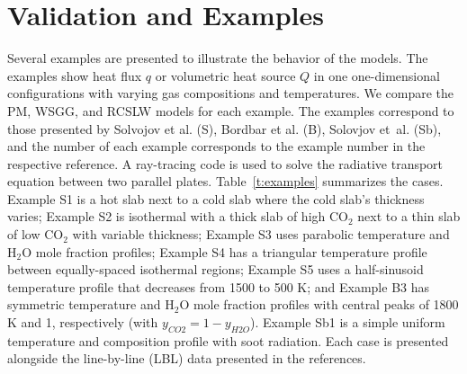 \documentclass[preprint,12pt]{elsarticle}
\begin{document}

\section{Validation and Examples} \label{s:Examples}

Several examples are presented to illustrate the behavior of the models. The examples show heat flux $q$ or volumetric heat source $Q$ in one one-dimensional configurations with varying gas compositions and temperatures. We compare the PM, WSGG, and RCSLW models for each example. The examples correspond to those presented by Solvojov et al. \cite{Solovjov_2017} (S), Bordbar et al. \cite{Bordbar_2020} (B), Solovjov et~al. \cite{Solovjov_2001} (Sb), and the number of each example corresponds to the example number in the respective reference. A ray-tracing code is used to solve the radiative transport equation between two parallel plates. 
Table~\ref{t:examples} summarizes the cases. Example S1 is a hot slab next to a cold slab where the cold slab's thickness varies; Example S2 is isothermal with a thick slab of high CO$_2$ next to a thin slab of low CO$_2$ with variable thickness; Example S3 uses parabolic temperature and H$_2$O mole fraction profiles; Example S4 has a triangular temperature profile between equally-spaced isothermal regions; Example S5 uses a half-sinusoid temperature profile that decreases from 1500 to 500 K; and Example B3 has symmetric temperature and H$_2$O mole fraction profiles with central peaks of 1800 K and 1, respectively (with $y_{CO2}=1-y_{H2O}$). Example Sb1 is a simple uniform temperature and composition profile with soot radiation. Each case is presented alongside the line-by-line (LBL) data presented in the references. 
%
\end{document}
